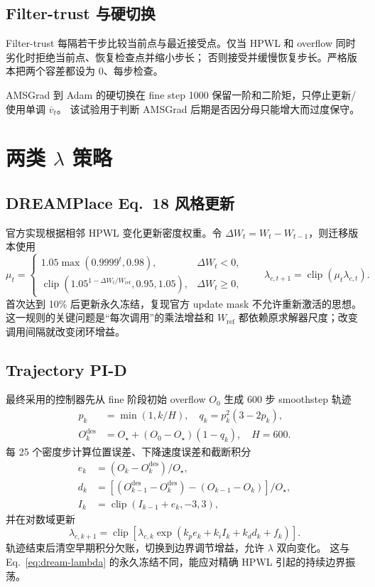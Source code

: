\documentclass[UTF8,fontset=windows,a4paper,11pt]{ctexart}
\newcommand{\clip}{\operatorname{clip}}
\begin{document}
\subsection{Filter-trust 与硬切换}

Filter-trust 每隔若干步比较当前点与最近接受点。仅当 HPWL 和 overflow 同时劣化时拒绝当前点、恢复检查点并缩小步长；
否则接受并缓慢恢复步长。严格版本把两个容差都设为 0、每步检查。

AMSGrad 到 Adam 的硬切换在 fine step 1000 保留一阶和二阶矩，只停止更新/使用单调 $\overline v_t$。
该试验用于判断 AMSGrad 后期是否因分母只能增大而过度保守。

\section{两类 $\lambda$ 策略}

\subsection{DREAMPlace Eq.~18 风格更新}

官方实现根据相邻 HPWL 变化更新密度权重。令 $\Delta W_t=W_t-W_{t-1}$，则迁移版本使用
\begin{equation}
 \mu_t=\begin{cases}
  1.05\max(0.9999^t,0.98), & \Delta W_t<0,\\
  \clip\left(1.05^{1-\Delta W_t/W_{\mathrm{ref}}},0.95,1.05\right), & \Delta W_t\geq0,
 \end{cases}
 \qquad \lambda_{c,t+1}=\clip(\mu_t\lambda_{c,t}).
 \label{eq:dream-lambda}
\end{equation}
首次达到 10\% 后更新永久冻结，复现官方 update mask 不允许重新激活的思想。
这一规则的关键问题是“每次调用”的乘法增益和 $W_{\mathrm{ref}}$ 都依赖原求解器尺度；改变调用间隔就改变闭环增益。

\subsection{Trajectory PI-D}

最终采用的控制器先从 fine 阶段初始 overflow $O_0$ 生成 600 步 smoothstep 轨迹
\begin{align}
 p_k&=\min(1,k/H),\quad q_k=p_k^2(3-2p_k),\\
 O_k^{\mathrm{des}}&=O_\star+(O_0-O_\star)(1-q_k),\quad H=600.
\end{align}
每 25 个密度步计算位置误差、下降速度误差和截断积分
\begin{align}
 e_k&=(O_k-O_k^{\mathrm{des}})/O_\star,\\
 d_k&=[(O_{k-1}^{\mathrm{des}}-O_k^{\mathrm{des}})-(O_{k-1}-O_k)]/O_\star,\\
 I_k&=\clip(I_{k-1}+e_k,-3,3),
\end{align}
并在对数域更新
\begin{equation}
 \lambda_{c,k+1}=\clip\left[
 \lambda_{c,k}\exp(k_pe_k+k_iI_k+k_dd_k+f_k)
 \right].
 \label{eq:pid}
\end{equation}
轨迹结束后清空早期积分欠账，切换到边界调节增益，允许 $\lambda$ 双向变化。
这与 Eq.~\eqref{eq:dream-lambda} 的永久冻结不同，能应对精确 HPWL 引起的持续边界振荡。
\end{document}
